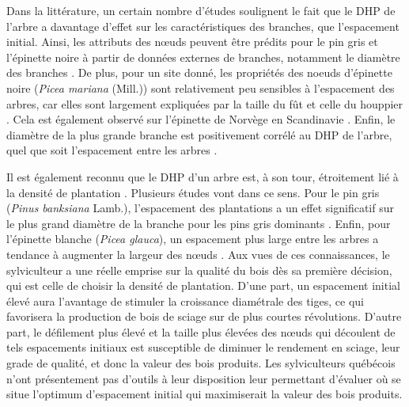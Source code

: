 \documentclass[letterpaper, 12pt]{article}
\begin{document}
\begin{onehalfspace}
Dans la littérature, un certain nombre d'études soulignent le fait que le DHP de l'arbre a davantage d'effet sur les caractéristiques des branches, que l'espacement initial. Ainsi, les attributs des nœuds peuvent être prédits pour le pin gris et l’épinette noire à partir de données externes de branches, notamment le diamètre des branches \cite{Duchateau2013}. De plus, pour un site donné, les propriétés des noeuds d'épinette noire (\textit{Picea mariana} (Mill.)) sont relativement peu sensibles à l'espacement des arbres, car elles sont largement expliquées par la taille du fût et celle du houppier \cite{Benjamin2009, Zhang2005}. Cela est également observé sur l'épinette de Norvège en Scandinavie \cite{Johansson1992, Makinen1999, Pfister2007}. Enfin, le diamètre de la plus grande branche est positivement corrélé au DHP de l'arbre, quel que soit l'espacement entre les arbres \cite{Hebert2016, Tong2005}. 

\vspace{12pt}

Il est également reconnu que le DHP d'un arbre est, à son tour, étroitement lié à la densité de plantation \cite{Pregent1998}. Plusieurs études vont dans ce sens. Pour le pin gris (\textit{Pinus banksiana} Lamb.), l'espacement des plantations a un effet significatif sur le plus grand diamètre de la branche pour les pins gris dominants \cite{Hebert2016}. Enfin, pour l'épinette blanche (\textit{Picea glauca}), un espacement plus large entre les arbres a tendance à augmenter la largeur des nœuds \cite{Tong2013}. %
Aux vues de ces connaissances, le sylviculteur a une réelle emprise sur la qualité du bois dès sa première décision, qui est celle de choisir la densité de plantation. %
D'une part, un espacement initial élevé aura l'avantage de stimuler la croissance diamétrale des tiges, ce qui favorisera la production de bois de sciage sur de plus courtes révolutions. D'autre part, le défilement plus élevé et la taille plus élevées des nœuds qui découlent de tels espacements initiaux est susceptible de diminuer le rendement en sciage, leur grade de qualité, et donc la valeur des bois produits. Les sylviculteurs québécois n'ont présentement pas d'outils à leur disposition leur permettant d'évaluer où se situe l'optimum d'espacement initial qui maximiserait la valeur des bois produits.


\end{onehalfspace}
\end{document}

